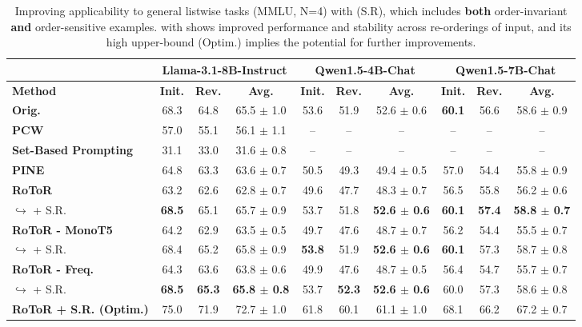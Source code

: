 
\begin{table*}[t]
\centering
\resizebox{0.8\linewidth}{!}
{
\begin{tabular}{l|ccc|ccc|ccc}
\hline
 & \multicolumn{3}{c|}{\textbf{Llama-3.1-8B-Instruct}} & \multicolumn{3}{c|}{\textbf{Qwen1.5-4B-Chat}} & \multicolumn{3}{c}{\textbf{Qwen1.5-7B-Chat}} \\ \hline
\textbf{Method} & \textbf{Init.} & \textbf{Rev.} & \textbf{Avg.} & \textbf{Init.} & \textbf{Rev.} & \textbf{Avg.} & \textbf{Init.} & \textbf{Rev.} & \textbf{Avg.} \\ \hline
\textbf{Orig.} & 68.3 & 64.8 & 65.5 $\pm$ 1.0 & 53.6 & 51.9 & 52.6 $\pm$ 0.6 & \textbf{\textbf{60.1}} & 56.6 & 58.6 $\pm$ 0.9 \\
\textbf{PCW} & 57.0 & 55.1 & 56.1 $\pm$ 1.1 & -- & -- & -- & -- & -- & -- \\
\textbf{Set-Based Prompting} & 31.1 & 33.0 & 31.6 $\pm$ 0.8 & -- & -- & -- & -- & -- & -- \\
\textbf{PINE} & 64.8 & 63.3 & 63.6 $\pm$ 0.7 & 50.5 & 49.3 & 49.4 $\pm$ 0.5 & 57.0 & 54.4 & 55.8 $\pm$ 0.9 \\
\textbf{RoToR} & 63.2 & 62.6 & 62.8 $\pm$ 0.7 & 49.6 & 47.7 & 48.3 $\pm$ 0.7 & 56.5 & 55.8 & 56.2 $\pm$ 0.6 \\
$\hookrightarrow$ + S.R. & \textbf{68.5} & 65.1 & 65.7 $\pm$ 0.9 & 53.7 & 51.8 & \textbf{52.6 $\pm$ 0.6} & \textbf{60.1} & \textbf{57.4} & \textbf{58.8 $\pm$ 0.7} \\
\textbf{RoToR - MonoT5} & 64.2 & 62.9 & 63.5 $\pm$ 0.5 & 49.7 & 47.6 & 48.7 $\pm$ 0.7 & 56.2 & 54.4 & 55.5 $\pm$ 0.7 \\
$\hookrightarrow$ + S.R. & 68.4 & 65.2 & 65.8 $\pm$ 0.9 & \textbf{53.8} & 51.9 & \textbf{52.6 $\pm$ 0.6} & \textbf{60.1} & 57.3 & 58.7 $\pm$ 0.8 \\
\textbf{RoToR - Freq.} & 64.3 & 63.6 & 63.8 $\pm$ 0.6 & 49.9 & 47.6 & 48.7 $\pm$ 0.5 & 56.4 & 54.7 & 55.7 $\pm$ 0.7 \\
$\hookrightarrow$ + S.R. & \textbf{68.5} & \textbf{65.3} & \textbf{65.8 $\pm$ 0.8} & 53.7 & \textbf{52.3} & \textbf{52.6 $\pm$ 0.6} & 60.0 & 57.3 & 58.6 $\pm$ 0.8 \\
\textbf{RoToR + S.R. (Optim.)} & 75.0 & 71.9 & 72.7 $\pm$ 1.0 & 61.8 & 60.1 & 61.1 $\pm$ 1.0 & 68.1 & 66.2 & 67.2 $\pm$ 0.7 \\ \hline
\end{tabular}
}
\caption{Improving applicability to general listwise tasks (MMLU, N=4) with \textbf{\sr{}} (S.R), which includes \textbf{both} order-invariant \textbf{and} order-sensitive examples. \ours{} with \sr{} shows improved performance and stability across re-orderings of input, and its high upper-bound (Optim.) implies the potential for further improvements.}

\label{table/mmlu}

\end{table*}
